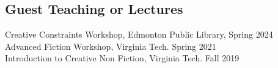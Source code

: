 \subsection{Guest Teaching or Lectures}

Creative Constraints Workshop, Edmonton Public Library, \hfill Spring 2024 \\
Advanced Fiction Workshop, Virginia Tech. \hfill Spring 2021 \\
Introduction to Creative Non Fiction, Virginia Tech. \hfill Fall 2019 \\
